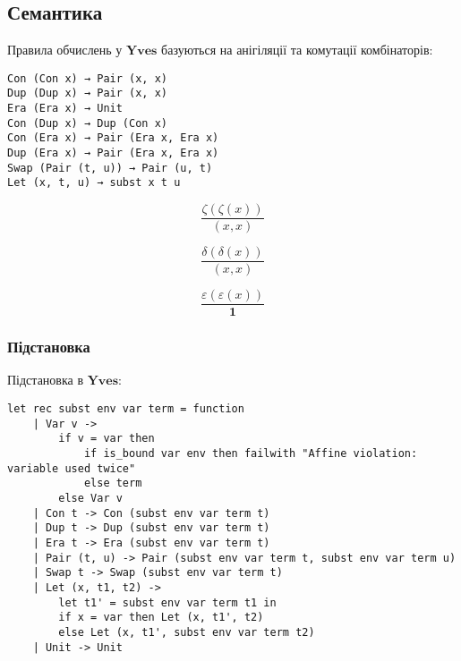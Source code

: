\documentclass{article}
\begin{document}
\newpage
\subsection{Семантика}

\begin{theorem}
Правила обчислень у $\mathbf{Yves}$ базуються на анігіляції та комутації комбінаторів:
\begin{lstlisting}[mathescape=true]
Con (Con x) → Pair (x, x)
Dup (Dup x) → Pair (x, x)
Era (Era x) → Unit
Con (Dup x) → Dup (Con x)
Con (Era x) → Pair (Era x, Era x)
Dup (Era x) → Pair (Era x, Era x)
Swap (Pair (t, u)) → Pair (u, t)
Let (x, t, u) → subst x t u
\end{lstlisting}
\end{theorem}

\begin{equation}
\tag{$\zeta$-annihilation}
\dfrac
{\zeta (\zeta (x))}
{(x, x)}
\end{equation}

\begin{equation}
\tag{$\delta$-annihilation}
\dfrac
{\delta (\delta (x))}
{(x, x)}
\end{equation}

\begin{equation}
\tag{$\epsilon$-annihilation}
\dfrac
{\varepsilon (\varepsilon (x))}
{\mathbf{1}}
\end{equation}

\subsubsection{Підстановка}

\begin{definition}
Підстановка в $\mathbf{Yves}$:
\begin{lstlisting}[mathescape=true]
let rec subst env var term = function
    | Var v ->
        if v = var then
            if is_bound var env then failwith "Affine violation: variable used twice"
            else term
        else Var v
    | Con t -> Con (subst env var term t)
    | Dup t -> Dup (subst env var term t)
    | Era t -> Era (subst env var term t)
    | Pair (t, u) -> Pair (subst env var term t, subst env var term u)
    | Swap t -> Swap (subst env var term t)
    | Let (x, t1, t2) ->
        let t1' = subst env var term t1 in
        if x = var then Let (x, t1', t2)
        else Let (x, t1', subst env var term t2)
    | Unit -> Unit
\end{lstlisting}
\end{definition}
\end{document}

